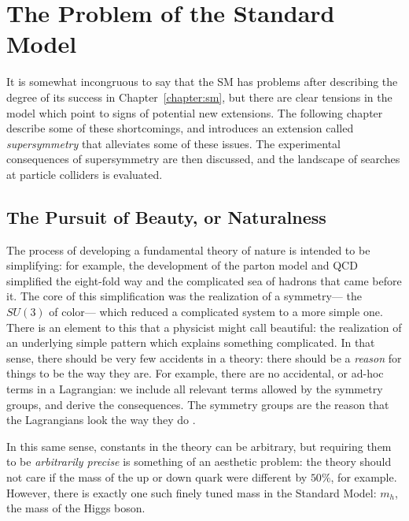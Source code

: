\label{chapter:susy}

\section{The Problem of the Standard Model}
\label{chapter:susy:problems}

It is somewhat incongruous to say that the SM has problems after describing the degree of its success in Chapter~\ref{chapter:sm}, but there are clear tensions in the model which point to signs of potential new extensions. The following chapter describe some of these shortcomings, and introduces an extension called \textit{supersymmetry} that alleviates some of these issues.  The experimental consequences of supersymmetry are then discussed, and the landscape of searches at particle colliders is evaluated.

\subsection{The Pursuit of Beauty, or Naturalness}
\label{chapter:susy:problems:naturalness}
The process of developing a fundamental theory of nature is intended to be simplifying: for example, the development of the parton model and QCD simplified the eight-fold way and the complicated sea of hadrons  that came before it.  The core of this simplification was the realization of a symmetry--- the $SU(3)$ of color--- which reduced a complicated system to a more simple one. There is an element to this that a physicist might call beautiful: the realization of an underlying simple pattern which explains something complicated. In that sense, there should be very few accidents in a theory: there should be a \textit{reason} for things to be the way they are. For example, there are no accidental, or ad-hoc terms in a Lagrangian: we include all relevant terms allowed by the symmetry groups, and derive the consequences. The symmetry groups are the reason that the Lagrangians look the way they do \cite{schwartz}.

In this same sense, constants in the theory can be arbitrary, but requiring them to be \textit{arbitrarily precise} is something of an aesthetic problem: the theory should not care if the mass of the up or down quark were different by $50\%$, for example. However, there is exactly one such finely tuned mass in the Standard Model: $m_h$, the mass of the Higgs boson. 

